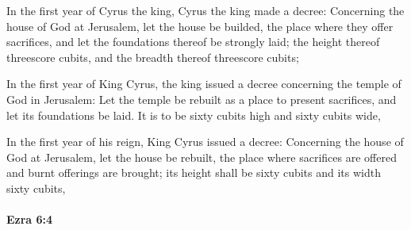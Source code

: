 			\begin{versebox}
					\item[BHS] 
					\item[LXX] 
					\item[ASV] In the first year of Cyrus the king, Cyrus the king made a decree: Concerning the house of God at Jerusalem, let the house be builded, the place where they offer sacrifices, and let the foundations thereof be strongly laid; the height thereof threescore cubits, and the breadth thereof threescore cubits;
					\item[NIV] In the first year of King Cyrus, the king issued a decree concerning the temple of God in Jerusalem: Let the temple be rebuilt as a place to present sacrifices, and let its foundations be laid. It is to be sixty cubits high and sixty cubits wide,
					\item[NRSV] In the first year of his reign, King Cyrus issued a decree: Concerning the house of God at Jerusalem, let the house be rebuilt, the place where sacrifices are offered and burnt offerings are brought; its height shall be sixty cubits and its width sixty cubits,
			\end{versebox}

		\paragraph{Ezra 6:4} %
			\label{EZRA-6-4}

